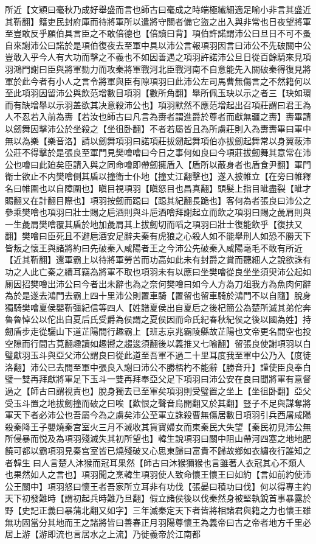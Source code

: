 所近【文穎曰毫秋乃成好舉盛而言也師古曰毫成之時端極纎細適足喻小非言其盛近其靳翻】籍吏民封府庫而待將軍所以遣將守關者備它盜之出入與非常也日夜望將軍至豈敢反乎願伯具言臣之不敢倍德也【倍讀曰背】項伯許諾謂沛公曰旦日不可不蚤自來謝沛公曰諾於是項伯復夜去至軍中具以沛公言報項羽因言曰沛公不先破關中公豈敢入乎今人有大功而擊之不義也不如因善遇之項羽許諾沛公旦日從百餘騎來見項羽鴻門謝曰臣與將軍勠力而攻秦將軍戰河北臣戰河南不自意能先入關破秦得復見將軍於此今者有小人之言令將軍與臣有隙項羽曰此沛公左司馬曹無傷言之不然籍何以至此項羽因留沛公與飲范增數目項羽【數所角翻】舉所佩玉玦以示之者三【玦如環而有缺增舉以示羽盖欲其决意殺沛公也】項羽默然不應范增起出召項莊謂曰君王為人不忍若入前為夀【若汝也師古曰凡言為夀者謂進爵於尊者而獻無疆之夀】夀畢請以劒舞因擊沛公於坐殺之【坐徂卧翻】不者若屬皆且為所虜莊則入為夀夀畢曰軍中無以為樂【樂音洛】請以劒舞項羽曰諾項莊拔劒起舞項伯亦拔劒起舞常以身翼蔽沛公莊不得擊於是張良至軍門見樊噲噲曰今日之事何如良曰今項莊拔劒舞其意常在沛公也噲曰此廹矣臣請入與之同命噲即帶劒擁盾入【盾所以蔽身者也盾食尹翻】軍門衛士欲止不内樊噲側其盾以撞衛士仆地【撞丈江翻擊也】遂入披帷立【在旁曰帷釋名曰帷圍也以自障圍也】瞋目視項羽【瞋怒目也昌真翻】頭髮上指目眦盡裂【眦才賜翻又在計翻目際也】項羽按劒而跽曰【跽其紀翻長跪也】客何為者張良曰沛公之參乘樊噲也項羽曰壯士賜之巵酒則與斗巵酒噲拜謝起立而飲之項羽曰賜之彘肩則與一生彘肩樊噲覆其盾於地加彘肩其上拔劒切而㗖之項羽曰壯士復能飲乎【復扶又翻】樊噲曰臣死且不避巵酒安足辭夫秦有虎狼之心殺人如不能舉刑人如恐不勝天下皆叛之懷王與諸將約曰先破秦入咸陽者王之今沛公先破秦入咸陽毫毛不敢有所近【近其靳翻】還軍霸上以待將軍勞苦而功高如此未有封爵之賞而聽細人之說欲誅有功之人此亡秦之續耳竊為將軍不取也項羽未有以應曰坐樊噲從良坐坐須臾沛公起如厠因招樊噲出沛公曰今者出未辭也為之奈何樊噲曰如今人方為刀俎我方為魚肉何辭為於是遂去鴻門去霸上四十里沛公則置車騎【置留也留車騎於鴻門不以自隨】脫身獨騎樊噲夏侯嬰靳彊紀信等四人【姓譜夏侯出自夏后之後杞簡公為楚所滅其弟佗奔魯魯悼公以佗出自夏后氏受爵為侯謂之夏侯因而命氏紀春秋紀侯之後以國為姓】持劒盾步走從驪山下道芷陽間行趣霸上【班志京兆霸陵縣故芷陽也文帝更名間空也投空隙而行間古莧翻趣讀如趣嚮之趨逡須翻後以義推又七喻翻】留張良使謝項羽以白璧獻羽玉斗與亞父沛公謂良曰從此道至吾軍不過二十里耳度我至軍中公乃入【度徒洛翻】沛公已去間至軍中張良入謝曰沛公不勝桮杓不能辭【勝音升】謹使臣良奉白璧一雙再拜獻將軍足下玉斗一雙再拜奉亞父足下項羽曰沛公安在良曰聞將軍有意督過之【師古曰謂視責也】脫身獨去已至軍矣項羽則受璧置之坐上【坐徂卧翻】亞父受玉斗置之地拔劒撞而破之曰唉【歎恨之聲音烏開翻又於其翻】豎子不足與謀奪將軍天下者必沛公也吾屬今為之虜矣沛公至軍立誅殺曹無傷居數日項羽引兵西屠咸陽殺秦降王子嬰燒秦宫室火三月不滅收其貨寶婦女而東秦民大失望【秦民初見沛公無所侵暴而悦及為項羽殘滅失其初所望也】韓生說項羽曰關中阻山帶河四塞之地地肥饒可都以霸項羽見秦宫室皆已燒殘破又心思東歸曰富貴不歸故鄉如衣繡夜行誰知之者韓生曰人言楚人沐猴而冠耳果然【師古曰沐猴獮猴也言雖著人衣冠其心不類人也果然如人之言也】項羽聞之烹韓生項羽使人致命懷王懷王曰如約【言如前約使沛公王關中】項羽怒曰懷王者吾家所立耳非有功伐【張晏曰積功曰伐】何以得專主約天下初發難時【謂初起兵時難乃旦翻】假立諸侯後以伐秦然身被堅執銳首事暴露於野【史記正義曰暴蒲北翻又如字】三年滅秦定天下者皆將相諸君與籍之力也懷王雖無功固當分其地而王之諸將皆曰善春正月羽陽尊懷王為義帝曰古之帝者地方千里必居上游【游即流也言居水之上流】乃徙義帝於江南都
